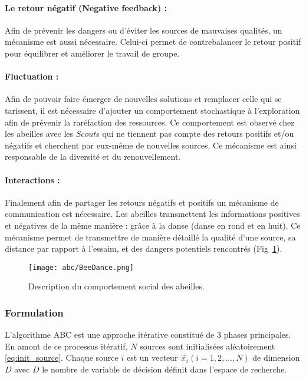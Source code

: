 \paragraph{Le retour négatif (Negative feedback) :} %
\label{par:negative_feedback}
Afin de prévenir les dangers ou d’éviter les sources de mauvaises qualités, un mécanisme est
aussi nécessaire. Celui-ci permet de contrebalancer le retour positif pour équilibrer
et améliorer le travail de groupe.

\paragraph{Fluctuation :} %
\label{par:fluctuation}
Afin de pouvoir faire émerger de nouvelles solutions et remplacer celle qui se
tarissent, il est nécessaire d’ajouter un comportement stochastique à l’exploration
afin de prévenir la raréfaction des ressources. Ce comportement est observé
chez les abeilles avec les $Scout$s qui ne tiennent pas compte des retours positifs
et/ou négatifs et cherchent par eux-même de nouvelles sources. Ce mécanisme est ainsi
responsable de la diversité et du renouvellement.

\paragraph{Interactions :} %
\label{par:intractions}
Finalement afin de partager les retours négatifs et positifs un mécanisme de communication
est nécessaire.
Les abeilles transmettent les informations positives et négatives de la même
manière : grâce à la danse (danse en rond et en huit).
Ce mécanisme permet de transmettre de manière détaillé la qualité d’une source, sa
distance par rapport à l’essaim, et des dangers potentiels rencontrés (Fig~\ref{fig:bee_dance}).

\begin{figure}
    \begin{center}
        \texttt{[image: abc/BeeDance.png]}
    \end{center}
    \caption{Description du comportement social des abeilles.
             \label{fig:bee_dance}}
\end{figure}
\FloatBarrier


\subsubsection{Formulation} %
\label{ssub:formulation}
L’algorithme ABC est une approche itérative constitué de 3 phases principales.
En amont de ce processus itératif, $N$ sources sont initialisées aléatoirement \eqref{eq:init_source}.
Chaque source $i$ est un vecteur $\vec{x}_{i}(i = 1, 2, \dotsc, N)$ de dimension $D$
avec $D$ le nombre de variable de décision définit dans l’espace de recherche.


